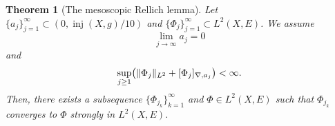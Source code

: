 \documentclass[a4paper,oneside,12pt]{amsart}
\theoremstyle{plain}
\newtheorem{theorem}{Theorem}[section]
\theoremstyle{definition}
\theoremstyle{remark}
\DeclarePairedDelimiter{\norm}{\lVert}{\rVert}
\DeclarePairedDelimiter{\seminorm}{\lbrack}{\rbrack}
\DeclareMathOperator{\injectivityradius}{inj}
\newcommand{\Ltwonorm}[2][L^2]{\norm{#2}_{#1}}
\newcommand{\mesoscopicdifferenceseminorm}[2][a]{\seminorm{#2}_{\nabla,#1}}
\begin{document}
\begin{theorem}[The mesoscopic Rellich lemma]\label{theorem: mesoscopic Rellich lemma}
  Let $\{a_j\}_{j=1}^{\infty} \subset (0,\injectivityradius(X,g)/10)$ and $\{\Phi_j\}_{j=1}^{\infty} \subset L^2(X,E)$.
  We assume
  \begin{equation}
    \lim_{j \to \infty} a_j = 0
  \end{equation}
  and
  \begin{equation}
    \sup_{j \ge 1} \bigl( \Ltwonorm{\Phi_j} + \mesoscopicdifferenceseminorm[a_j]{\Phi_j} \bigr) < \infty.
  \end{equation}
  Then, there exists a subsequence $\{\Phi_{j_k}\}_{k=1}^{\infty}$ and $\Phi \in L^2(X,E)$ such that $\Phi_{j_k}$ converges to $\Phi$ strongly in $L^2(X,E)$.
\end{theorem}
\end{document}
